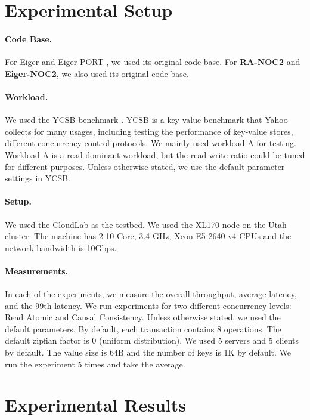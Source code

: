 \section{Experimental Setup}
\paragraph{Code Base.} For Eiger \cite{lloyd2013stronger} and Eiger-PORT \cite{lu2020performance}, we used its original code base. For \textbf{RA-NOC2} and \textbf{Eiger-NOC2}, we also used its original code base. 

\paragraph{Workload.} We used the YCSB benchmark \cite{cooper2010benchmarking}. YCSB is a key-value benchmark that Yahoo collects for many usages, including testing the performance of key-value stores, different concurrency control protocols. We mainly used workload A for testing. Workload A is a read-dominant workload, but the read-write ratio could be tuned for different purposes. Unless otherwise stated, we use the default parameter settings in YCSB.

\paragraph{Setup.} We used the CloudLab \cite{duplyakin2019design} as the testbed.  We used the XL170 node on the Utah cluster. The machine has 2 10-Core, 3.4 GHz, Xeon E5-2640 v4 CPUs and the network bandwidth is 10Gbps. 

\paragraph{Measurements.} 
In each of the experiments, we measure the overall throughput, average latency, and the 99th latency. We run experiments for two different concurrency levels: Read Atomic and Causal Consistency. Unless otherwise stated, we used the default parameters. By default, each transaction contains 8 operations. The default zipfian factor is 0 (uniform distribution). We used 5 servers and 5 clients by default. The value size is 64B and the number of keys is 1K by default. We run the experiment 5 times and take the average.

\section{Experimental Results}
